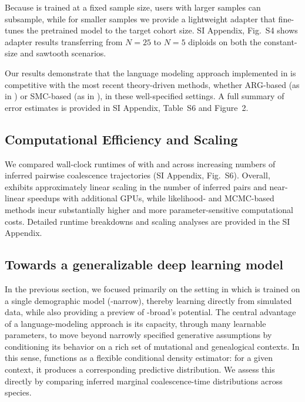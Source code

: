 \documentclass[9pt,twocolumn,twoside]{pnas-new}
\begin{document}
Because \cxtkit is trained at a fixed sample size, users with larger samples can subsample,
while for smaller samples we provide a lightweight adapter that fine-tunes the pretrained model
to the target cohort size.
SI Appendix, Fig.~S4 shows adapter results transferring from $N=25$ to $N=5$ diploids
on both the constant-size and sawtooth scenarios.





Our results demonstrate that the language modeling approach implemented in \cxtkit is competitive with
the most recent theory-driven methods, whether ARG-based (as in \singer) or SMC-based (as in \smcpp), in these well-specified settings.
A full summary of error estimates is provided in SI Appendix, Table~S6 and Figure~2.





\subsection*{Computational Efficiency and Scaling}

We compared wall-clock runtimes of \cxtkit with \smcpp and \singer across increasing numbers of inferred pairwise coalescence trajectories (SI Appendix, Fig.~S6). 
Overall, \cxtkit exhibits approximately linear scaling in the number of inferred pairs and near-linear speedups with additional GPUs, while likelihood- and MCMC-based methods incur substantially higher and more parameter-sensitive computational costs. 
Detailed runtime breakdowns and scaling analyses are provided in the SI Appendix.



\subsection*{Towards a generalizable deep learning model}
In the previous section, we focused primarily on the setting in which \cxtkit is trained on a single demographic model (\cxtkit-narrow), 
thereby learning directly from simulated data, while also providing a preview of \cxtkit-broad's potential.
The central advantage of a language-modeling approach is its capacity, through many learnable parameters,
to move beyond narrowly specified generative assumptions by conditioning its behavior 
on a rich set of mutational and genealogical contexts.
In this sense, \cxtkit functions as a flexible conditional density estimator: for a given context, it produces a corresponding predictive distribution. 
We assess this directly by comparing inferred marginal coalescence-time distributions across species.
\end{document}
